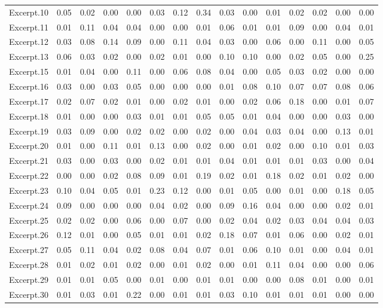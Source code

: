 \documentclass[
]{article}
\newenvironment{lltable}{\begin{landscape}\begin{center}\begin{ThreePartTable}}{\end{ThreePartTable}\end{center}\end{landscape}}
\begin{document}
\begin{lltable}
{\begin{longtable}{lllllllllllllll}
Excerpt.10 & 0.05 & 0.02 & 0.00 & 0.00 & 0.03 & 0.12 & 0.34 & 0.03 & 0.00 & 0.01 & 0.02 & 0.02 & 0.00 & 0.00\\
Excerpt.11 & 0.01 & 0.11 & 0.04 & 0.04 & 0.00 & 0.00 & 0.01 & 0.06 & 0.01 & 0.01 & 0.09 & 0.00 & 0.04 & 0.01\\
Excerpt.12 & 0.03 & 0.08 & 0.14 & 0.09 & 0.00 & 0.11 & 0.04 & 0.03 & 0.00 & 0.06 & 0.00 & 0.11 & 0.00 & 0.05\\
Excerpt.13 & 0.06 & 0.03 & 0.02 & 0.00 & 0.02 & 0.01 & 0.00 & 0.10 & 0.10 & 0.00 & 0.02 & 0.05 & 0.00 & 0.25\\
Excerpt.15 & 0.01 & 0.04 & 0.00 & 0.11 & 0.00 & 0.06 & 0.08 & 0.04 & 0.00 & 0.05 & 0.03 & 0.02 & 0.00 & 0.00\\
Excerpt.16 & 0.03 & 0.00 & 0.03 & 0.05 & 0.00 & 0.00 & 0.00 & 0.01 & 0.08 & 0.10 & 0.07 & 0.07 & 0.08 & 0.06\\
Excerpt.17 & 0.02 & 0.07 & 0.02 & 0.01 & 0.00 & 0.02 & 0.01 & 0.00 & 0.02 & 0.06 & 0.18 & 0.00 & 0.01 & 0.07\\
Excerpt.18 & 0.01 & 0.00 & 0.00 & 0.03 & 0.01 & 0.01 & 0.05 & 0.05 & 0.01 & 0.04 & 0.00 & 0.00 & 0.03 & 0.00\\
Excerpt.19 & 0.03 & 0.09 & 0.00 & 0.02 & 0.02 & 0.00 & 0.02 & 0.00 & 0.04 & 0.03 & 0.04 & 0.00 & 0.13 & 0.01\\
Excerpt.20 & 0.01 & 0.00 & 0.11 & 0.01 & 0.13 & 0.00 & 0.02 & 0.00 & 0.01 & 0.02 & 0.00 & 0.10 & 0.01 & 0.03\\
Excerpt.21 & 0.03 & 0.00 & 0.03 & 0.00 & 0.02 & 0.01 & 0.01 & 0.04 & 0.01 & 0.01 & 0.01 & 0.03 & 0.00 & 0.04\\
Excerpt.22 & 0.00 & 0.00 & 0.02 & 0.08 & 0.09 & 0.01 & 0.19 & 0.02 & 0.01 & 0.18 & 0.02 & 0.01 & 0.02 & 0.00\\
Excerpt.23 & 0.10 & 0.04 & 0.05 & 0.01 & 0.23 & 0.12 & 0.00 & 0.01 & 0.05 & 0.00 & 0.01 & 0.00 & 0.18 & 0.05\\
Excerpt.24 & 0.09 & 0.00 & 0.00 & 0.00 & 0.04 & 0.02 & 0.00 & 0.09 & 0.16 & 0.04 & 0.00 & 0.00 & 0.02 & 0.01\\
Excerpt.25 & 0.02 & 0.02 & 0.00 & 0.06 & 0.00 & 0.07 & 0.00 & 0.02 & 0.04 & 0.02 & 0.03 & 0.04 & 0.04 & 0.03\\
Excerpt.26 & 0.12 & 0.01 & 0.00 & 0.05 & 0.01 & 0.01 & 0.02 & 0.18 & 0.07 & 0.01 & 0.06 & 0.00 & 0.02 & 0.01\\
Excerpt.27 & 0.05 & 0.11 & 0.04 & 0.02 & 0.08 & 0.04 & 0.07 & 0.01 & 0.06 & 0.10 & 0.01 & 0.00 & 0.04 & 0.01\\
Excerpt.28 & 0.01 & 0.02 & 0.01 & 0.02 & 0.00 & 0.01 & 0.02 & 0.00 & 0.01 & 0.11 & 0.04 & 0.00 & 0.00 & 0.06\\
Excerpt.29 & 0.01 & 0.01 & 0.05 & 0.00 & 0.01 & 0.00 & 0.01 & 0.01 & 0.00 & 0.00 & 0.08 & 0.01 & 0.00 & 0.01\\
Excerpt.30 & 0.01 & 0.03 & 0.01 & 0.22 & 0.00 & 0.01 & 0.01 & 0.03 & 0.10 & 0.01 & 0.01 & 0.01 & 0.00 & 0.00\\
\bottomrule
\end{longtable}

}

\end{lltable}
\end{document}
